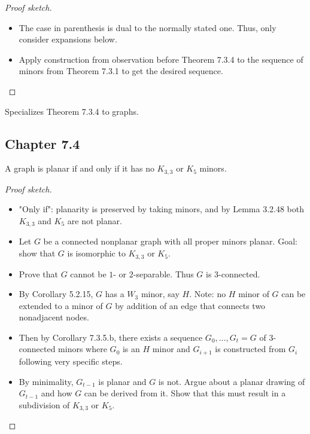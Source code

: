 \begin{proof}[Proof sketch]
  \begin{itemize}
    \item The case in parenthesis is dual to the normally stated one. Thus, only consider expansions below.
    \item Apply construction from observation before Theorem 7.3.4 to the sequence of minors from Theorem 7.3.1 to get the desired sequence.
  \end{itemize}
\end{proof}

\begin{corollary}[7.3.5]
  \label{cor:7.3.5}
  Specializes Theorem 7.3.4 to graphs.
\end{corollary}


\subsection{Chapter 7.4}

\begin{theorem}
  \label{thm:7.4.1}
  A graph is planar if and only if it has no $K_{3,3}$ or $K_{5}$ minors.
\end{theorem}

\begin{proof}[Proof sketch]
  \begin{itemize}
    \item "Only if": planarity is preserved by taking minors, and by Lemma 3.2.48 both $K_{3,3}$ and $K_{5}$ are not planar.
    \item Let $G$ be a connected nonplanar graph with all proper minors planar. Goal: show that $G$ is isomorphic to $K_{3,3}$ or $K_{5}$.
    \item Prove that $G$ cannot be $1$- or $2$-separable. Thus $G$ is $3$-connected.
    \item By Corollary 5.2.15, $G$ has a $W_{3}$ minor, say $H$. Note: no $H$ minor of $G$ can be extended to a minor of $G$ by addition of an edge that connects two nonadjacent nodes.
    \item Then by Corollary 7.3.5.b, there exists a sequence $G_{0}, \dots, G_{t} = G$ of $3$-connected minors where $G_{0}$ is an $H$ minor and $G_{i + 1}$ is constructed from $G_{i}$ following very specific steps.
    \item By minimality, $G_{t - 1}$ is planar and $G$ is not. Argue about a planar drawing of $G_{t - 1}$ and how $G$ can be derived from it. Show that this must result in a subdivision of $K_{3,3}$ or $K_{5}$.
  \end{itemize}
\end{proof}

